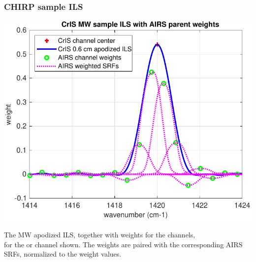 \documentclass[9pt]{beamer}
\begin{document}
\begin{frame}
\frametitle{CHIRP sample ILS}
\begin{center}
  \includegraphics[scale=0.5]{figures/sample_CrIS_ILS_with_AIRS_parent_SRFs.pdf}
\end{center}
\vspace{-3mm}

The MW {\chirp} apodized ILS, together with weights for the {\airs}
channels, \\ for the {\cris} or {\chirp} channel shown.  The {\airs}
weights are paired with the corresponding AIRS SRFs, normalized to
the weight values.


\end{frame} %
\end{document}
